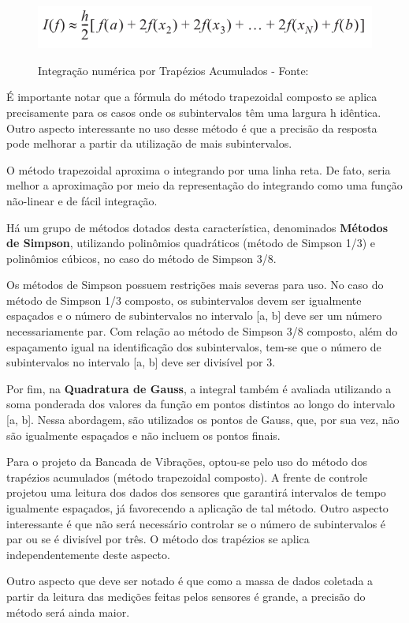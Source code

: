 \begin{figure}[H]
\centering
\includegraphics[keepaspectratio=true,scale=0.52]	{figuras/metodo_trapezoidal.png}
\label{fig:metodo_trapezoidal}
\caption{Integração numérica por Trapézios Acumulados - Fonte: }
\end{figure}

É importante notar que a fórmula do método trapezoidal composto se aplica precisamente para os casos onde os subintervalos têm uma largura h
idêntica. Outro aspecto interessante no uso desse método é que a precisão da resposta pode melhorar a partir da utilização de mais subintervalos.

O método trapezoidal aproxima o integrando por uma linha reta. De fato, seria melhor a aproximação por meio da representação do integrando 
como uma função não-linear e de fácil integração.

Há um grupo de métodos dotados desta característica, denominados \textbf{Métodos de Simpson}, utilizando polinômios quadráticos (método de
Simpson 1/3) e polinômios cúbicos, no caso do método de Simpson 3/8.

Os métodos de Simpson possuem restrições mais severas para uso. No caso do método de Simpson 1/3 composto, os subintervalos devem ser 
igualmente espaçados e o número de subintervalos no intervalo [a, b] deve ser um número necessariamente par. Com relação ao método de Simpson 
3/8 composto, além do espaçamento igual na identificação dos subintervalos, tem-se que o número de subintervalos no intervalo [a, b] deve ser 
divisível por 3.

Por fim, na \textbf{Quadratura de Gauss}, a integral também é avaliada utilizando a soma ponderada dos valores da função em pontos distintos 
ao longo do intervalo [a, b]. Nessa abordagem, são utilizados os pontos de Gauss, que, por sua vez, não são igualmente espaçados e não incluem 
os pontos finais.

Para o projeto da Bancada de Vibrações, optou-se pelo uso do método dos trapézios acumulados (método trapezoidal composto). A frente de 
controle projetou uma leitura dos dados dos sensores que garantirá intervalos de tempo igualmente espaçados, já favorecendo a aplicação de 
tal método. Outro aspecto interessante é que não será necessário controlar se o número de subintervalos é par ou se é divisível por três. 
O método dos trapézios se aplica independentemente deste aspecto.

Outro aspecto que deve ser notado é que como a massa de dados coletada a partir da leitura das medições feitas pelos sensores é grande, a
precisão do método será ainda maior.